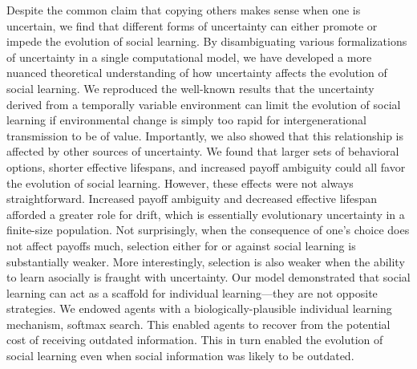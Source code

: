 \documentclass[letterpaper,11.5pt]{scrartcl}
\newcommand{\cm}[1]{{\textcolor{mypurple} {({\tiny CM:} #1)}}}
\begin{document}
 Despite the common claim that copying others makes sense when one is uncertain, we find that different forms of uncertainty can either promote or impede the evolution of social learning. By disambiguating various formalizations of uncertainty in a single computational model, we have developed a more nuanced theoretical understanding of how uncertainty affects the evolution of social learning.
We reproduced the well-known results that the uncertainty derived from a temporally variable environment can limit the evolution of social learning if environmental change is simply too rapid for intergenerational transmission to be of value. Importantly, we also showed that this relationship is affected by other sources of uncertainty. 
We found that larger sets of behavioral options, shorter effective lifespans, and increased payoff ambiguity could all favor the evolution of social learning. However, these effects were not always straightforward. 
Increased payoff ambiguity and decreased effective lifespan afforded a greater role for drift, which is essentially
evolutionary uncertainty in a finite-size population. Not surprisingly, when the consequence of one's choice does not affect payoffs much, selection either for or against social learning is substantially weaker. More interestingly, selection is also weaker when the ability to learn asocially is fraught with uncertainty. Our model demonstrated that social learning can act as a scaffold for individual learning---they are not opposite strategies. We endowed agents with a biologically-plausible individual learning mechanism, softmax search. This enabled agents to recover from the potential cost of receiving outdated information. This in turn enabled the evolution of social learning even when social information was likely to be outdated. 

\end{document}
